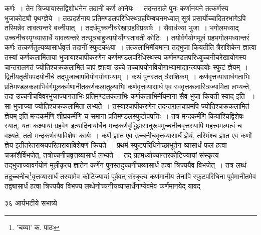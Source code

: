 \documentclass[11pt, openany]{book}
\begin{document}
{{{{\vspace{0.3cm}
\noindent कर्णः~। तेन त्रिज्यायास्तद्विशोधनेन तदानीं कर्ण आनेयः~। तदन्तराले पुनः कर्णानयने तत्कर्णस्य भुजाकोट्यौ पृथग्ज्ञेये~। तत्प्रदर्शनाय प्रतिमण्डलपरिधिस्थग्रहबिम्बघनमध्यात् सूत्रं प्रसार्योच्चादितरभागेऽपि तस्मिन्नेव तावत्यन्तरे बध्नीयात्~। तदर्धमुच्चनीचरेखाग्रहविप्रकर्षः~। सैवार्धज्या भुजा~। भगोलमध्याद् उच्चनीचस्पृग्व्यासार्धे यावत्यन्तरे तत्सूत्रबाहुज्ययोर्योगस्तावती कोटिः~। तयोर्वर्गयोगमूलं ग्रहभगोलमध्यान्तरं कर्णः तत्कर्णतुल्यव्यासार्धवृत्तं तदानीं स्फुटकक्ष्या~। तत्कलाभिर्मीयमाना तद्भुजा कियतीति त्रैराशिकेन ज्ञात्वा तस्यां कर्णकलामिताया भुजायाश्चापीकरणेन कर्णमण्डलपरिधिस्थस्य कर्णमण्डलपरिध्युच्चनीचरेखायोगस्य चान्तरालगतं ज्योतिश्चक्रकलामितं चापं ज्ञात्वा उच्चे तच्चापयोगवियोगाभ्यामाद्यान्त्यपदयोः स्फुटं ज्ञेयम्~। द्वितीयतृतीयपदयोर्नीचे तद्भुजाचापवियोगयोगाभ्याम्~। कथं पुनस्तत् त्रैराशिकम्~। कर्णवृत्तव्यासार्धगताभिः प्रतिमण्डलकलाभिर्वर्गमूलकर्मणानीतकर्णकलातुल्याभिः कर्णवृत्तव्यासार्ध एव
स्ववृत्तकलास्त्रिज्यामिता लभ्यन्ते, तदा उच्चनीचविवरभुजाज्यागताभिः प्रतिमण्डलकलाभिः कर्णकलाभिर्मीयमाना सैव भुजा कियती स्याद् इति~ ।
सा भुजाज्या ज्योतिश्चक्रकलामिता लभ्यते~। तस्याश्चापीकरणेन तदन्तरालचापमपि ज्योतिश्चक्रकलामितं ज्ञेयम् इति मन्दकर्मणि शीघ्रकर्मणि च
समाना प्रतिमण्डलस्फुटोपपत्तिः~। तत्र मन्दकर्मणि कियांश्चिद्विशेषः स्यात्, यतः {\qt कक्ष्यायां ग्रहवेग} इत्यादिनार्यार्धेन
मन्दकर्णवृद्धिह्रासानुरूपमुच्चनीचवृत्तस्यापि महत्त्वमल्पत्वं च वक्ष्यते, ततो मन्दकर्णस्याविशेषः कार्यः~। कर्णे ज्ञात एव उच्चनीचवृत्तव्यासार्धं ज्ञेयं, तस्मिंश्च ज्ञात एव कर्णो ज्ञेय इतीतरेतराश्रयपरिहारायाविशेषणं क्रियते~। प्रथमं स्फुटपरिधिनेच्छाभूतेन व्यासार्धं फलं हत्वा चक्रांशैर्विभजेत्,
तत्रोच्चनीचवृत्तव्यासार्धं लभ्यते~। तद् ग्रहमध्योच्चान्तरकोटिज्यायां संस्कृत्य तद्भुजाज्यावर्गयोगं मूलीकृत्य ज्ञातेन कर्णेन पुनस्तदुच्चनीचव्यासार्धं हत्वा त्रिज्ययैव विभजेत्~। तत्र लब्धं तदुच्चनीच\renewcommand{\thefootnote}{१}\footnote{'चव्या' क. पाठः}वृत्तव्यासार्धं तस्यामेव कोटिज्यायां पूर्ववत् संस्कृत्य कर्णमानीय तेनापि स्फुटपरिधिना पूर्वमानीतमेव तद्व्यासार्धं हत्वा त्रिज्ययैव विभज्य लब्धेनोच्चनीचव्यासार्धेनाप्येवमेव कर्णमानयेद् यावद्

\newpage

\vspace{3cm} ३६\hspace{4cm} आर्यभटीये सभाष्ये

}}}}
\end{document}
